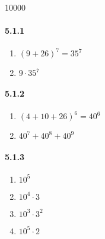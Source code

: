 \documentclass[11pt, letterpaper, twocolumn, fleqn]{article}
\begin{document}
\renewcommand{\labelenumi}{\alph{enumi}.}
\renewcommand{\labelenumii}{(\arabic{enumii})}
\renewcommand{\qedsymbol}{$\blacksquare$}

 10000
\raggedbottom

\paragraph{5.1.1}
\begin{enumerate}
  \item $(9 + 26)^7 = 35^7$
  \item $9 \cdot 35^7$
\end{enumerate}

\paragraph{5.1.2}
\begin{enumerate}
  \item $(4 + 10 + 26)^6 = 40^6$
  \item $40^7 + 40^8 + 40^9$
\end{enumerate}

\paragraph{5.1.3}
\begin{enumerate}
  \item $10^5$
  \item $10^4 \cdot 3$
  \item $10^3 \cdot 3^2$
  \item $10^5 \cdot 2$
\end{enumerate}
\end{document}
